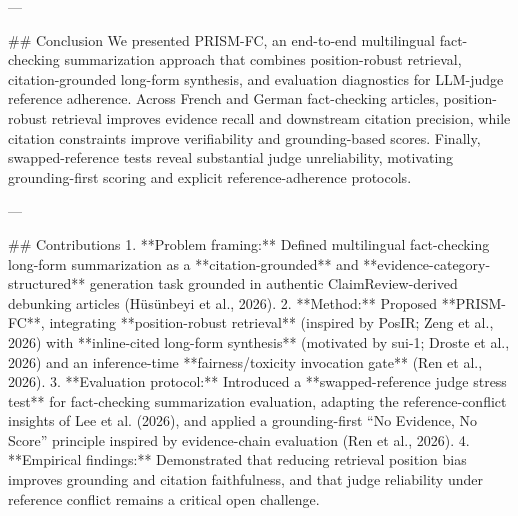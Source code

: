 ---

## Conclusion  
We presented PRISM-FC, an end-to-end multilingual fact-checking summarization approach that combines position-robust retrieval, citation-grounded long-form synthesis, and evaluation diagnostics for LLM-judge reference adherence. Across French and German fact-checking articles, position-robust retrieval improves evidence recall and downstream citation precision, while citation constraints improve verifiability and grounding-based scores. Finally, swapped-reference tests reveal substantial judge unreliability, motivating grounding-first scoring and explicit reference-adherence protocols.

---

## Contributions  
1. **Problem framing:** Defined multilingual fact-checking long-form summarization as a **citation-grounded** and **evidence-category-structured** generation task grounded in authentic ClaimReview-derived debunking articles (Hüsünbeyi et al., 2026).  
2. **Method:** Proposed **PRISM-FC**, integrating **position-robust retrieval** (inspired by PosIR; Zeng et al., 2026) with **inline-cited long-form synthesis** (motivated by sui-1; Droste et al., 2026) and an inference-time **fairness/toxicity invocation gate** (Ren et al., 2026).  
3. **Evaluation protocol:** Introduced a **swapped-reference judge stress test** for fact-checking summarization evaluation, adapting the reference-conflict insights of Lee et al. (2026), and applied a grounding-first “No Evidence, No Score” principle inspired by evidence-chain evaluation (Ren et al., 2026).  
4. **Empirical findings:** Demonstrated that reducing retrieval position bias improves grounding and citation faithfulness, and that judge reliability under reference conflict remains a critical open challenge.

